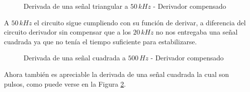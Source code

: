 \documentclass[11pt, a4paper]{article}
\begin{document}
\begin{figure}[H]
	\begin{center}
		\caption{Derivada de una señal triangular a $50 \,kHz$ - Derivador compensado}
		\label{fig:derivtriangCOMP50kHz}
	\end{center}
\end{figure}

A $50 \, kHz$ el circuito sigue cumpliendo con su función de derivar, a diferencia del circuito derivador sin compensar que a los $20 \, kHz$ no nos entregaba una señal cuadrada ya que no tenía el tiempo suficiente para estabilizarse.

\begin{figure}[H]
	\begin{center}
		\caption{Derivada de una señal cuadrada a $500 \,Hz$ - Derivador compensado}
		\label{fig:derivCUAdradaCOMP}
	\end{center}
\end{figure}

Ahora también es apreciable la derivada de una señal cuadrada la cual son pulsos, como puede verse en la Figura \ref{fig:derivCUAdradaCOMP}.
\end{document}
